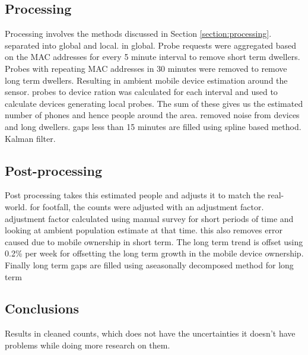 \subsection{Processing}
Processing involves the methods discussed in Section \ref{section:processing}.
separated into global and local.
in global.
Probe requests were aggregated based on the MAC addresses for every 5 minute interval to remove short term dwellers.
Probes with repeating MAC addresses in 30 minutes were removed to remove long term dwellers.
Resulting in ambient mobile device estimation around the sensor.
probes to device ration was calculated for each interval and used to calculate devices generating local probes.
The sum of these gives us the estimated number of phones and hence people around the area.
removed noise from devices and long dwellers.
gaps less than 15 minutes are filled using spline based method. Kalman filter.


\subsection{Post-processing}
Post processing takes this estimated people and adjusts it to match the real-world.
for footfall, the counts were adjusted with an adjustment factor.
adjustment factor calculated using manual survey for short periods of time and looking at ambient population estimate at that time.
this also removes error caused due to mobile ownership in short term.
The long term trend is offset using 0.2\% per week for offsetting the long term growth in the mobile device ownership.
Finally long term gaps are filled using aseasonally decomposed method for long term

\subsection{Conclusions}
Results in cleaned counts, which does not have the uncertainties
it doesn't have problems while doing more research on them.

